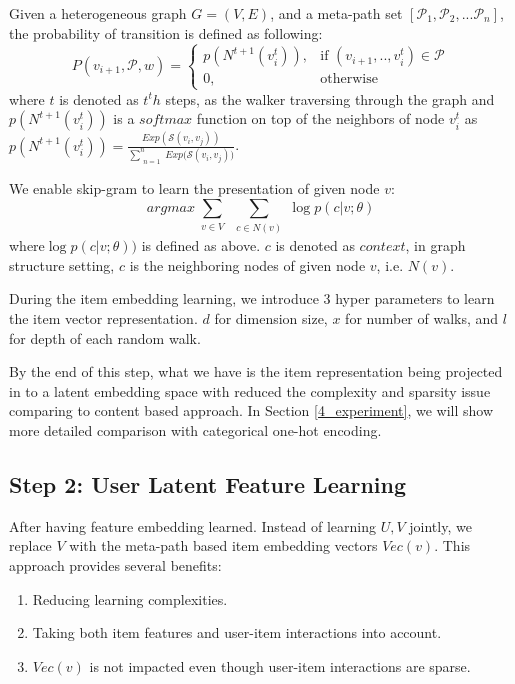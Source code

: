 Given a heterogeneous graph $G = (V,E)$, and a meta-path set $[\mathcal{P}_1, \mathcal{P}_2, ... \mathcal{P}_n]$, the probability of transition is defined as following:
\begin{equation}\label{hetewalker}
    P(v_{i+1},\mathcal{P},w)= 
        \begin{cases}
            p({N^{t+1}(v_{i}^t)}),& \text{if } (v_{i+1}, .., v_{i}^t) \in \mathcal{P} \\
            0,              & \text{otherwise}
        \end{cases}
\end{equation}
where $t$ is denoted as $t^th$ steps, as the walker traversing through the graph and $p({N^{t+1}(v_{i}^t)})$ is a $softmax$ function on top of the neighbors of node $v_{i}^t$ as $p({N^{t+1}(v_{i}^t)}) = \frac{Exp(\mathcal{S}(v_i,v_j))}{\sum\limits_{\substack{n=1}}^{n} {Exp(\mathcal{S}(v_i,v_j)})}$.

We enable skip-gram to learn the presentation of given node $v$:
\begin{equation}\label{skipgram}
    arg max
    \sum\limits_{\substack{v \in V}}
    \sum\limits_{\substack{c \in N(v)}}
    \log p({c|v;\theta})
\end{equation}
where$\log p({c|v;\theta}))$ is defined as above. $c$ is denoted as $context$, in graph structure setting, $c$ is the neighboring nodes of given node $v$, i.e. $N(v)$. 

During the item embedding learning, we introduce 3 hyper parameters to learn the item vector representation. $d$ for dimension size, $x$ for number of walks, and $l$ for depth of each random walk.

By the end of this step, what we have is the item representation being projected in to a latent embedding space with reduced the complexity and sparsity issue comparing to content based approach. In Section \ref{4_experiment}, we will show more detailed comparison with categorical one-hot encoding.

\subsection{Step 2: User Latent Feature Learning}\label{3PCC}
After having feature embedding learned. Instead of learning $U, V$ jointly, we replace $V$ with the meta-path based item embedding vectors $Vec(v)$. This approach provides several benefits:

\begin{enumerate}
    \item Reducing learning complexities.
    \item Taking both item features and user-item interactions into account.
    \item $Vec(v)$ is not impacted even though user-item interactions are sparse.
\end{enumerate}

